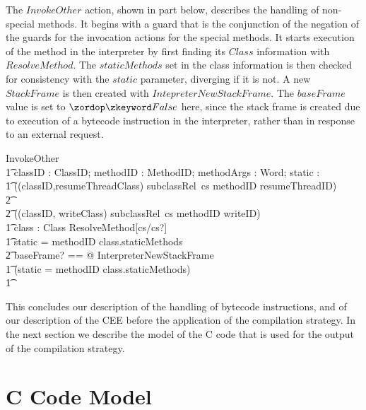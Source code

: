 The $InvokeOther$ action, shown in part below, describes the handling
of non-special methods.
It begins with a guard that is the conjunction of the negation of the
guards for the invocation actions for the special methods.
It starts execution of the method in the interpreter by first finding
its $Class$ information with $ResolveMethod$.
The $staticMethods$ set in the class information is then checked for
consistency with the $static$ parameter, diverging if it is not.
A new $StackFrame$ is then created with $IntepreterNewStackFrame$.
The $baseFrame$ value is set to $\false$ here, since the stack frame
is created due to execution of a bytecode instruction in the
interpreter, rather than in response to an external request.
\begin{circusaction}
  InvokeOther \circdef \\
  \t1 \circval classID : ClassID; \circval methodID : MethodID; \circval methodArgs : \seq Word; \circval static : \boolean \circspot \\
  \t1 \lcircguard ((classID,resumeThreadClass) \notin subclassRel~cs \lor methodID \neq resumeThreadID) \\
  \t2 {} \land \cdots \\
  \t2 {} \land ((classID, writeClass) \notin subclassRel~cs \lor methodID \neq writeID) \rcircguard \circguard {} \\
  \t1 \circvar class : Class \circspot \lschexpract ResolveMethod[cs/cs?] \rschexpract \circseq \\
  \t1 \circif static = \true \iff methodID \in class.staticMethods \circthen {} \\
  \t2 \lschexpract \exists baseFrame? == \false @ InterpreterNewStackFrame \rschexpract \\
  \t1 {} \circelse \lnot (static = \true \iff methodID \in class.staticMethods) \circthen \Chaos \\
  \t1 \circfi
\end{circusaction}

This concludes our description of the handling of bytecode
instructions, and of our description of the CEE before the application
of the compilation strategy.
In the next section we describe the model of the C code that is used
for the output of the compilation strategy.

\section{C Code Model}
\label{cee-c-code-section}

